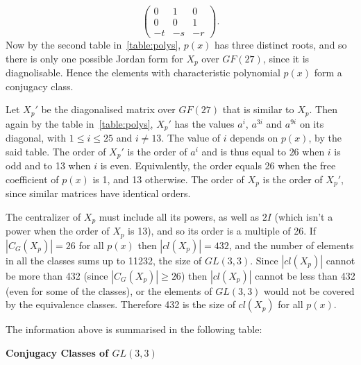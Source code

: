 \documentclass[11pt]{article} \usepackage{amssymb}
\begin{document}
\begin{enumerate}
\begin{enumerate}
\begin{itemize}
\begin{equation*}
          \begin{pmatrix}
            0&1  &0 \\ 
            0&0  &1 \\ 
            -t&-s  &-r 
          \end{pmatrix}.
        \end{equation*}
        Now by the second table in~\ref{table:polys}, $p(x)$ has three 
        distinct roots, and so there is only one possible Jordan form for $X_p$
        over $GF(27)$, since it is diagnolisable.
        Hence the elements with characteristic polynomial $p(x)$
        form a conjugacy class.
        
        Let $X_p'$ be the diagonalised matrix over $GF(27)$ that is similar
        to $X_p$. Then again by the table in~\ref{table:polys}, $X_p'$ has
        the values $a^i$, $a^{3i}$ and $a^{9i}$ on its diagonal, with $1 \leq i \leq 25$ and
        $i \neq 13$. The value of $i$ depends on $p(x)$, by the said table.
        The order of $X_p'$ is the order of $a^i$
        and is thus equal to $26$ when $i$ is odd and to 13 when $i$ is even.
        Equivalently, the order equals
        26 when the free coefficient of $p(x)$ is 1, and 13 otherwise.
        The order of $X_p$ is the order of $X_p'$, 
        since similar matrices have identical orders.

        The centralizer of $X_p$ must include all its powers, as well as
        $2I$ (which isn't a power when the order of $X_p$ is 13), and so its 
        order is a multiple of 26. If $|C_G(X_p)|=26$ for all $p(x)$ then
        $|cl(X_p)|=432$, and the number of elements in all the classes sums
        up to 11232, the size of $GL(3,3)$. Since $|cl(X_p)|$ cannot be more
        than 432 (since $|C_G(X_p)| \geq 26$) then $|cl(X_p)|$ cannot be less
        than 432 (even for some of the classes), or the elements of $GL(3,3)$ 
        would not be covered by the
        equivalence classes. Therefore 432 is the size of $cl(X_p)$
        for all $p(x)$. 
      \end{itemize}
      The information above is summarised in the following table:

      {\bf Conjugacy Classes of $GL(3,3)$}


\end{enumerate}
\end{enumerate}
\end{document}
